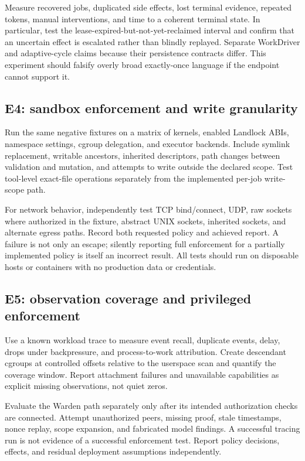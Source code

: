 Measure recovered jobs, duplicated side effects, lost terminal evidence, repeated tokens, manual interventions, and time to a coherent terminal state. In particular, test the lease-expired-but-not-yet-reclaimed interval and confirm that an uncertain effect is escalated rather than blindly replayed. Separate WorkDriver and adaptive-cycle claims because their persistence contracts differ. This experiment should falsify overly broad exactly-once language if the endpoint cannot support it.

\subsection{E4: sandbox enforcement and write granularity}

Run the same negative fixtures on a matrix of kernels, enabled Landlock ABIs, namespace settings, cgroup delegation, and executor backends. Include symlink replacement, writable ancestors, inherited descriptors, path changes between validation and mutation, and attempts to write outside the declared scope. Test tool-level exact-file operations separately from the implemented per-job write-scope path.

For network behavior, independently test TCP bind/connect, UDP, raw sockets where authorized in the fixture, abstract UNIX sockets, inherited sockets, and alternate egress paths. Record both requested policy and achieved report. A failure is not only an escape; silently reporting full enforcement for a partially implemented policy is itself an incorrect result. All tests should run on disposable hosts or containers with no production data or credentials.

\subsection{E5: observation coverage and privileged enforcement}

Use a known workload trace to measure event recall, duplicate events, delay, drops under backpressure, and process-to-work attribution. Create descendant cgroups at controlled offsets relative to the userspace scan and quantify the coverage window. Report attachment failures and unavailable capabilities as explicit missing observations, not quiet zeros.

Evaluate the Warden path separately only after its intended authorization checks are connected. Attempt unauthorized peers, missing proof, stale timestamps, nonce replay, scope expansion, and fabricated model findings. A successful tracing run is not evidence of a successful enforcement test. Report policy decisions, effects, and residual deployment assumptions independently.

